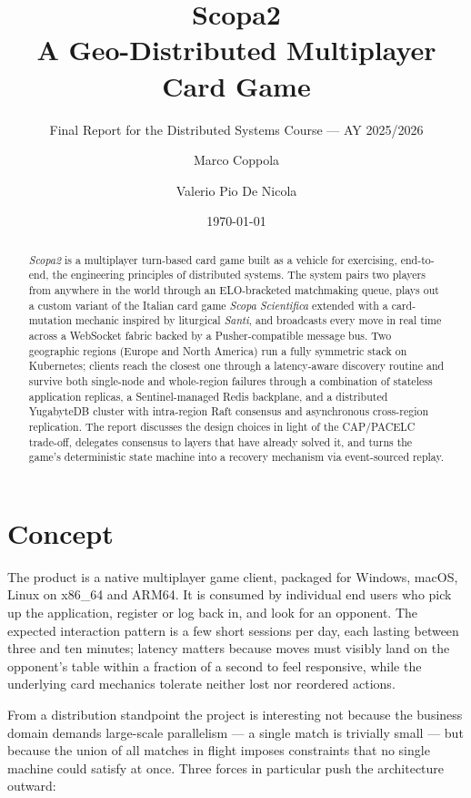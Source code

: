 \documentclass{scrartcl}
\title{\LARGE
    Scopa2\\
    A Geo-Distributed Multiplayer Card Game
}
\subtitle{Final Report for the Distributed Systems Course --- AY 2025/2026}
\author{
    Marco Coppola \\ \emailaddr{marco.coppola3@studio.unibo.it}
    \and
    Valerio Pio De Nicola \\ \emailaddr{valeriopio.denicola@studio.unibo.it}
}
\date{\today}
\begin{document}
\maketitle

\begin{abstract}
\emph{Scopa2} is a multiplayer turn-based card game built as a vehicle for
exercising, end-to-end, the engineering principles of distributed systems.
The system pairs two players from anywhere in the world through an
ELO-bracketed matchmaking queue, plays out a custom variant of the Italian
card game \emph{Scopa Scientifica} extended with a card-mutation mechanic
inspired by liturgical \emph{Santi}, and broadcasts every move in real time
across a WebSocket fabric backed by a Pusher-compatible message bus. Two
geographic regions (Europe and North America) run a fully symmetric stack
on Kubernetes; clients reach the closest one through a latency-aware
discovery routine and survive both single-node and whole-region failures
through a combination of stateless application replicas, a Sentinel-managed
Redis backplane, and a distributed YugabyteDB cluster with intra-region
Raft consensus and asynchronous cross-region replication. The report
discusses the design choices in light of the CAP/PACELC trade-off,
delegates consensus to layers that have already solved it, and turns the
game's deterministic state machine into a recovery mechanism via
event-sourced replay.
\end{abstract}

\tableofcontents

\section{Concept}\label{concept}

The product is a native multiplayer game client, packaged for Windows,
macOS, Linux on x86\_64 and ARM64. It is consumed by individual end users
who pick up the application, register or log back in, and look for an
opponent. The expected interaction pattern is a few short sessions per
day, each lasting between three and ten minutes; latency matters because
moves must visibly land on the opponent's table within a fraction of a
second to feel responsive, while the underlying card mechanics tolerate
neither lost nor reordered actions.

From a distribution standpoint the project is interesting not because the
business domain demands large-scale parallelism --- a single match is
trivially small --- but because the union of all matches in flight imposes
constraints that no single machine could satisfy at once. Three forces in
particular push the architecture outward:
\end{document}
